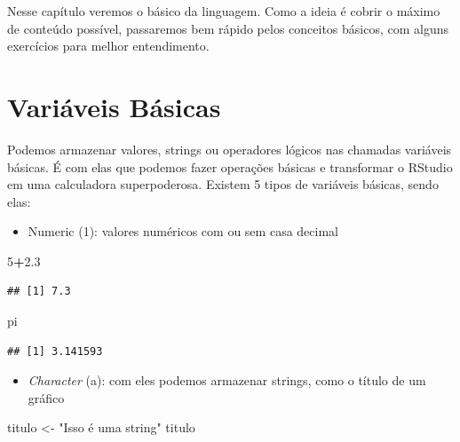 \documentclass[]{book}
\newenvironment{Shaded}{\begin{snugshade}}{\end{snugshade}}
\newcommand{\DecValTok}[1]{\textcolor[rgb]{0.00,0.00,0.81}{#1}}
\newcommand{\FloatTok}[1]{\textcolor[rgb]{0.00,0.00,0.81}{#1}}
\newcommand{\StringTok}[1]{\textcolor[rgb]{0.31,0.60,0.02}{#1}}
\newcommand{\OperatorTok}[1]{\textcolor[rgb]{0.81,0.36,0.00}{\textbf{#1}}}
\newcommand{\NormalTok}[1]{#1}
\providecommand{\tightlist}{%
  \setlength{\itemsep}{0pt}\setlength{\parskip}{0pt}}
\theoremstyle{definition}
\theoremstyle{definition}
\theoremstyle{definition}
\theoremstyle{remark}
\begin{document}
Nesse capítulo veremos o básico da linguagem. Como a ideia é cobrir o
máximo de conteúdo possível, passaremos bem rápido pelos conceitos
básicos, com alguns exercícios para melhor entendimento.

\section{Variáveis Básicas}\label{variaveis-basicas}

Podemos armazenar valores, strings ou operadores lógicos nas chamadas
variáveis básicas. É com elas que podemos fazer operações básicas e
transformar o RStudio em uma calculadora superpoderosa. Existem 5 tipos
de variáveis básicas, sendo elas:

\begin{itemize}
\tightlist
\item
  Numeric (1): valores numéricos com ou sem casa decimal
\end{itemize}

\begin{Shaded}
\begin{Highlighting}[]
\DecValTok{5}\OperatorTok{+}\FloatTok{2.3}
\end{Highlighting}
\end{Shaded}

\begin{verbatim}
## [1] 7.3
\end{verbatim}

\begin{Shaded}
\begin{Highlighting}[]
\NormalTok{pi}
\end{Highlighting}
\end{Shaded}

\begin{verbatim}
## [1] 3.141593
\end{verbatim}

\begin{itemize}
\tightlist
\item
  \emph{Character} (a): com eles podemos armazenar strings, como o
  título de um gráfico
\end{itemize}

\begin{Shaded}
\begin{Highlighting}[]
\NormalTok{titulo <-}\StringTok{ "Isso é uma string"}
\NormalTok{titulo}
\end{Highlighting}
\end{Shaded}
\end{document}
